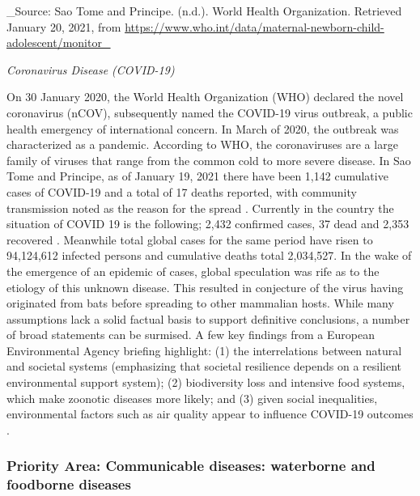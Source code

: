 \documentclass[
]{book}
\begin{document}
\_Source: Sao Tome and Principe. (n.d.). World Health Organization. Retrieved January 20, 2021, from \url{https://www.who.int/data/maternal-newborn-child-adolescent/monitor_}

\emph{Coronavirus Disease (COVID-19)}

On 30 January 2020, the World Health Organization (WHO) declared the novel coronavirus (nCOV), subsequently named the COVID-19 virus outbreak, a public health emergency of international concern. In March of 2020, the outbreak was characterized as a pandemic. According to WHO, the coronaviruses are a large family of viruses that range from the common cold to more severe disease. In Sao Tome and Principe, as of January 19, 2021 there have been 1,142 cumulative cases of COVID-19 and a total of 17 deaths reported, with community transmission noted as the reason for the spread . Currently in the country the situation of COVID 19 is the following; 2,432 confirmed cases, 37 dead and 2,353 recovered . Meanwhile total global cases for the same period have risen to 94,124,612 infected persons and cumulative deaths total 2,034,527. In the wake of the emergence of an epidemic of cases, global speculation was rife as to the etiology of this unknown disease. This resulted in conjecture of the virus having originated from bats before spreading to other mammalian hosts. While many assumptions lack a solid factual basis to support definitive conclusions, a number of broad statements can be surmised. A few key findings from a European Environmental Agency briefing highlight: (1) the interrelations between natural and societal systems (emphasizing that societal resilience depends on a resilient environmental support system); (2) biodiversity loss and intensive food systems, which make zoonotic diseases more likely; and (3) given social inequalities, environmental factors such as air quality appear to influence COVID-19 outcomes .

\hypertarget{priority-area-communicable-diseases-waterborne-and-foodborne-diseases}{%
\subsubsection{Priority Area: Communicable diseases: waterborne and foodborne diseases}\label{priority-area-communicable-diseases-waterborne-and-foodborne-diseases}}
\end{document}
